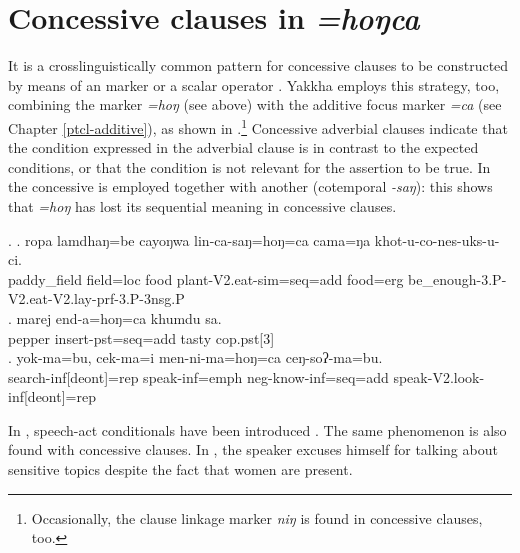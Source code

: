 \section{Concessive clauses in \emph{=hoŋca}}\label{adv-cl-conc}

It is a crosslinguistically common pattern for concessive clauses to be constructed by means of an  marker or a scalar operator \citep[980]{Koenig1993_Focus}. Yakkha employs this strategy, too, combining the  marker  \emph{=hoŋ} (see above) with the additive focus marker \emph{=ca} (see Chapter \ref{ptcl-additive}), as shown in \Next.\footnote{Occasionally, the   clause linkage marker \emph{niŋ} is found in concessive clauses, too.} Concessive adverbial clauses indicate that the condition expressed in the adverbial clause is in contrast to the expected conditions, or that the condition is not relevant for the assertion to be true. In \Next[a] the concessive is employed together with another  (cotemporal \emph{-saŋ}): this shows that  \emph{=hoŋ} has lost its sequential meaning in concessive clauses.

\ex. \ag. ropa  lamdhaŋ=be    cayoŋwa  lin-ca-saŋ=hoŋ=ca  cama=ŋa   khot-u-co-nes-uks-u-ci.\\
paddy\_field field{\sc =loc} food plant{\sc -V2.eat-sim=seq=add} food{\sc =erg} be\_enough{\sc -3.P-V2.eat-V2.lay-prf-3.P-3nsg.P}\\
 
\bg. marej end-a=hoŋ=ca khumdu sa.\\
 pepper insert{\sc [3sg]-pst=seq=add} tasty {\sc cop.pst[3]}\\
 \bg. yok-ma=bu, cek-ma=i men-ni-ma=hoŋ=ca ceŋ-soʔ-ma=bu.\\
 search{\sc -inf[deont]=rep} speak{\sc -inf=emph} {\sc neg-}know{\sc -inf=seq=add} speak{\sc -V2.look-inf[deont]=rep}\\
 
 In , speech-act conditionals have been introduced \citep{Thompsonetal2007_Adverbial}. The same phenomenon is also found with concessive clauses. In \Next, the speaker excuses himself for talking about sensitive topics despite the fact that women are present. 
 
